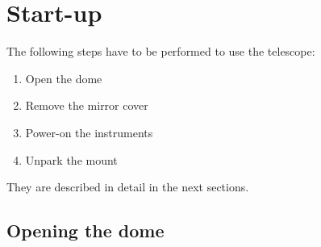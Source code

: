 \documentclass[a4paper, 11pt, fleqn]{memoir}
\begin{document}

\clearpage

\section{Start-up} The following steps have to be performed to use the telescope:
\begin{enumerate}
    \item Open the dome
    \item Remove the mirror cover
    \item Power-on the instruments
    \item Unpark the mount
\end{enumerate}
They are described in detail in the next sections.

\subsection{Opening the dome}
\end{document}
